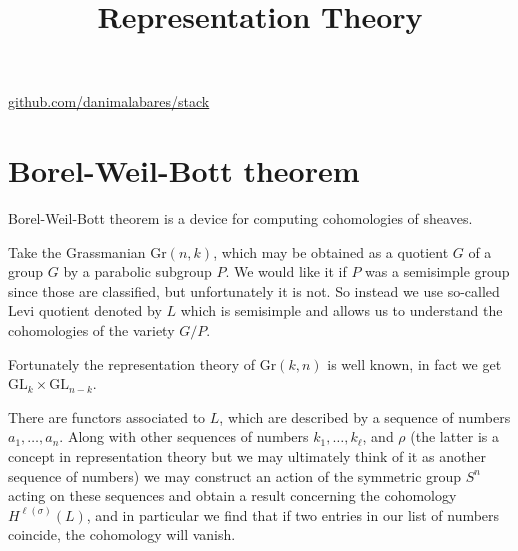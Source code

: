 



\title{Representation Theory}
\maketitle

\label{section-phantom}
\hfill
\href{http://github.com/danimalabares/stack}{github.com/danimalabares/stack}

\tableofcontents

\section{Borel-Weil-Bott theorem}
\label{section-Borel-Weil-Bott-thoerem}

Borel-Weil-Bott theorem is a device for computing cohomologies of sheaves.

Take the Grassmanian $\text{Gr}(n,k)$, which may be obtained as a quotient $G$
of a group $G$ by a parabolic subgroup $P$. We would like it if $P$ was a
semisimple group since those are classified, but unfortunately it is not. 
So instead we use so-called Levi quotient denoted by $L$ which is semisimple
and allows us to understand the cohomologies of the variety $G/P$.

Fortunately the representation theory of $\text{Gr}(k,n)$ is well known, in fact
we get $\text{GL}_k \times \text{GL}_{n-k}$.

There are functors associated to $L$, which are described by a sequence of
numbers $a_1,\ldots,a_n$. Along with other sequences of numbers
$k_1,\ldots,k_\ell$, and $\rho$ (the latter is a concept in representation
theory but we may ultimately think of it as another sequence of numbers) we may
construct an action of the symmetric group $S^n$ acting on these sequences and
obtain a result concerning the cohomology $H^{\ell(\sigma)}(L)$, and in
particular we find that if two entries in our list of numbers coincide, the
cohomology will vanish.







